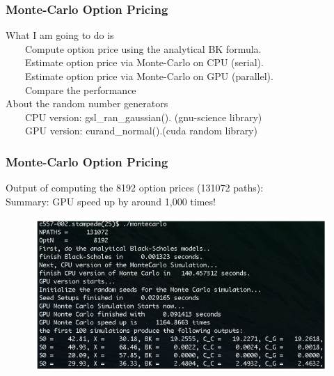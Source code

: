 \documentclass[xcolor={x11names,svgnames,dvipsnames}]{beamer}
\begin{document}
\begin{frame}
\frametitle{Monte-Carlo Option Pricing}
What I am going to do is\\
\ \ \ \ Compute option price using the analytical BK formula.\\
\ \ \ \ Estimate option price via Monte-Carlo on CPU (serial).\\
\ \ \ \ Estimate option price via Monte-Carlo on GPU (parallel).\\
\ \ \ \ Compare the performance\\
\vspace{1cm}
About the random number generators\\
\ \ \ \ CPU version: gsl\_ran\_gaussian(). (gnu-science library)\\
\ \ \ \ GPU version: curand\_normal().(cuda random library)\\
\end{frame}

\begin{frame}
\frametitle{Monte-Carlo Option Pricing}
Output of computing the 8192 option prices (131072 paths):\\
Summary: GPU speed up by around 1,000 times!
 \begin{figure}
     \includegraphics[width=1\textwidth, height=0.6\textheight]{mc.png}
\end{figure}



\end{frame}
\end{document}
